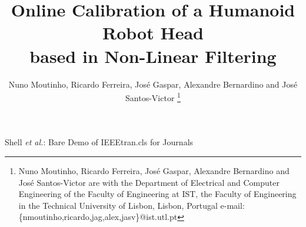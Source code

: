 \documentclass[journal]{IEEEtran}
\begin{document}
%
\title{Online Calibration of a Humanoid Robot Head\\
based in Non-Linear Filtering}
%
%
%

\author{Nuno Moutinho, Ricardo Ferreira, Jos\'e Gaspar, Alexandre Bernardino and Jos\'e Santos-Victor%
\thanks{Nuno Moutinho, Ricardo Ferreira, Jos\'e Gaspar, Alexandre Bernardino and Jos\'e Santos-Victor are with the Department
of Electrical and Computer Engineering of the Faculty of Engineering at IST, the Faculty of Engineering in the Technical University of Lisbon, Lisbon, Portugal e-mail: \{nmoutinho,ricardo,jag,alex,jasv\}@ist.utl.pt}%
}


%
{Shell \MakeLowercase{\textit{et al.}}: Bare Demo of IEEEtran.cls for Journals}


\maketitle



%
\IEEEpeerreviewmaketitle




%


%
\end{document}
